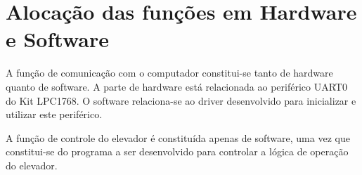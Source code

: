 \section{Alocação das funções em Hardware e Software}

A função de comunicação com o computador constitui-se tanto de hardware quanto de software. A parte de hardware está relacionada ao periférico UART0 do Kit LPC1768. O software relaciona-se ao driver desenvolvido para inicializar e utilizar este periférico.

A função de controle do elevador é constituída apenas de software, uma vez que constitui-se do programa a ser desenvolvido para controlar a lógica de operação do elevador.




